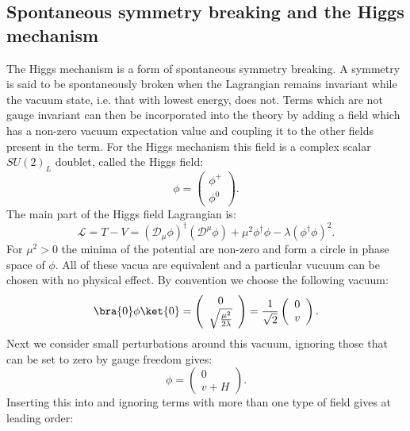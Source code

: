 \subsection{Spontaneous symmetry breaking and the Higgs mechanism}
\label{sec:ssb}
The Higgs mechanism is a form of spontaneous symmetry breaking. A symmetry is said to be spontaneously broken when the Lagrangian remains invariant while the vacuum state, i.e. that with lowest energy, does not. Terms which are not gauge invariant can then be incorporated into the theory by adding a field which has a non-zero vacuum expectation value and coupling it to the other fields present in the term. For the Higgs mechanism this field is a complex scalar $SU\left(2\right)_{L}$ doublet, called the Higgs field:
\begin{equation}
\phi=\left(\begin{array}{c}\phi^+ \\ \phi^0 \end{array}\right).
\end{equation}
The main part of the Higgs field Lagrangian is:
\begin{equation}
  \label{eq:higlag}
\mathcal{L}=T-V=\left(\mathcal{D}_{\mu}\phi\right)^{\dag}\left(\mathcal{D}^{\mu}\phi\right)+\mu^{2}\phi^{\dag}\phi-\lambda\left(\phi^{\dag}\phi\right)^{2}.
\end{equation}
For $\mu^{2}>0$ the minima of the potential are non-zero and form a circle in phase space of $\phi$. All of these vacua are equivalent and a particular vucuum can be chosen with no physical effect. By convention we choose the following vacuum:
\begin{equation}
  \bra{0}\phi\ket{0}=\left(\begin{array}{c} 0 \\ \sqrt{\frac{\mu^{2}}{2\lambda}} \end{array}\right)=\frac{1}{\sqrt{2}}\left(\begin{array}{c} 0 \\ v \end{array}\right).
\end{equation}
Next we consider small perturbations around this vacuum, ignoring those that can be set to zero by gauge freedom gives:
\begin{equation}
  \phi=\left(\begin{array}{c}0 \\ v+H \end{array}\right).
\end{equation}
Inserting this into  and ignoring terms with more than one type of field gives at leading order:
